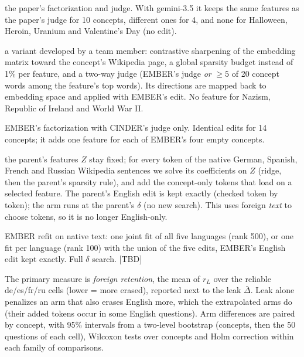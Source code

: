 \begin{description}
\setlength\itemsep{1pt}
\item[EMBER] the paper's factorization and judge. With gemini-3.5 it keeps the same features as the paper's judge for 10 concepts, different ones for 4, and none for Halloween, Heroin, Uranium and Valentine's Day (no edit).
\item[CINDER] a variant developed by a team member: contrastive sharpening of the embedding matrix toward the concept's Wikipedia page, a global sparsity budget instead of 1\% per feature, and a two-way judge (EMBER's judge \emph{or} $\geq 5$ of 20 concept words among the feature's top words). Its directions are mapped back to embedding space and applied with EMBER's edit. No feature for Nazism, Republic of Ireland and World War II.
\item[EMBER + two-way judge] EMBER's factorization with CINDER's judge only. Identical edits for 14 concepts; it adds one feature for each of EMBER's four empty concepts.
\item[+X (extrapolation)] the parent's features $Z$ stay fixed; for every token of the native German, Spanish, French and Russian Wikipedia sentences we solve its coefficients on $Z$ (ridge, then the parent's sparsity rule), and add the concept-only tokens that load on a selected feature. The parent's English edit is kept exactly (checked token by token); the arm runs at the parent's $\delta$ (no new search). This uses foreign \emph{text} to choose tokens, so it is no longer English-only.
\item[Native fits] EMBER refit on native text: one joint fit of all five languages (rank 500), or one fit per language (rank 100) with the union of the five edits, EMBER's English edit kept exactly. Full $\delta$ search. [TBD]
\end{description}

The primary measure is \emph{foreign retention}, the mean of $r_L$ over the reliable de/es/fr/ru cells (lower = more erased), reported next to the leak $\bar\Delta$.
Leak alone penalizes an arm that also erases English more, which the extrapolated arms do (their added tokens occur in some English questions).
Arm differences are paired by concept, with 95\% intervals from a two-level bootstrap (concepts, then the 50 questions of each cell), Wilcoxon tests over concepts and Holm correction within each family of comparisons.

